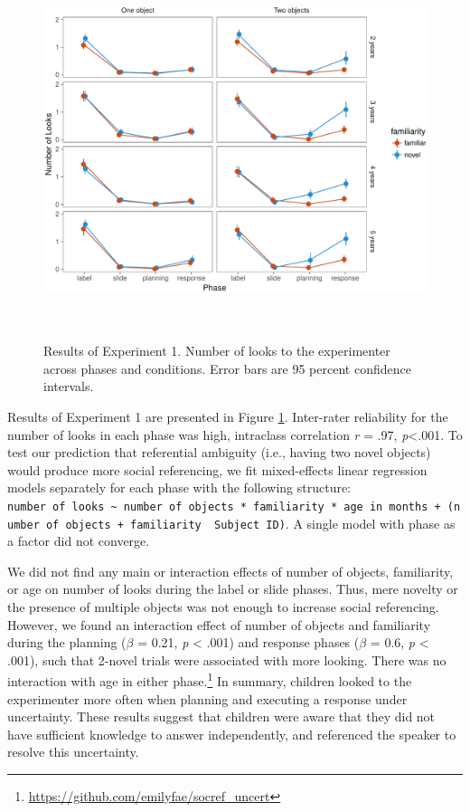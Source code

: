 \documentclass[10pt, letterpaper]{article}
\newenvironment{CodeChunk}{}{}
\begin{document}
\begin{CodeChunk}
\begin{figure}[h]

{\centering \includegraphics[width=5.75in,height=4.35in]{figs/results_e1-1} 

}

\caption[Results of Experiment 1]{Results of Experiment 1. Number of looks to the experimenter across phases and conditions. Error bars are 95 percent confidence intervals.}\label{fig:results_e1}
\end{figure}
\end{CodeChunk}

Results of Experiment 1 are presented in Figure \ref{fig:results_e1}.
Inter-rater reliability for the number of looks in each phase was high,
intraclass correlation \emph{r} = .97, \emph{p}\textless{}.001. To test
our prediction that referential ambiguity (i.e., having two novel
objects) would produce more social referencing, we fit mixed-effects
linear regression models separately for each phase with the following
structure:
\texttt{number\ of\ looks\ \textasciitilde{}\ number\ of\ objects\ *\ familiarity\ *\ age\ in\ months\ +\ (number\ of\ objects\ +\ familiarity\ \textbar{}\ Subject\ ID)}.
A single model with phase as a factor did not converge.

We did not find any main or interaction effects of number of objects,
familiarity, or age on number of looks during the label or slide phases.
Thus, mere novelty or the presence of multiple objects was not enough to
increase social referencing. However, we found an interaction effect of
number of objects and familiarity during the planning (\emph{\(\beta\)}
= 0.21, \emph{p} \textless{} .001) and response phases (\emph{\(\beta\)}
= 0.6, \emph{p} \textless{} .001), such that 2-novel trials were
associated with more looking. There was no interaction with age in
either phase.\footnote{\url{https://github.com/emilyfae/socref_uncert}}
In summary, children looked to the experimenter more often when planning
and executing a response under uncertainty. These results suggest that
children were aware that they did not have sufficient knowledge to
answer independently, and referenced the speaker to resolve this
uncertainty.
\end{document}
